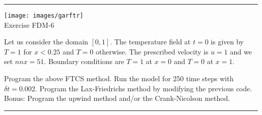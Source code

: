 \begin{center}
\begin{minipage}[t]{0.77\textwidth}
\par\noindent\rule{\textwidth}{0.4pt}

\begin{center}
\texttt{[image: images/garftr]} \\
{\color{orange}Exercise FDM-6}
\end{center}

Let us consider the domain $[0,1]$. The temperature field at $t=0$ is 
given by $T=1$ for $x<0.25$ and $T=0$ otherwise. The prescribed 
velocity is $u=1$ and we set $nnx=51$.
Boundary conditions are $T=1$ at $x=0$ and $T=0$ at $x=1$.

\begin{center}

\end{center}

Program the above FTCS method. Run the model for 250 time steps with $\delta t=0.002$. 
Program the Lax-Friedrichs method by modifying the previous code.\\
Bonus: Program the upwind method and/or the Crank-Nicolson method. 

\par\noindent\rule{\textwidth}{0.4pt}
\end{minipage}
\end{center}



